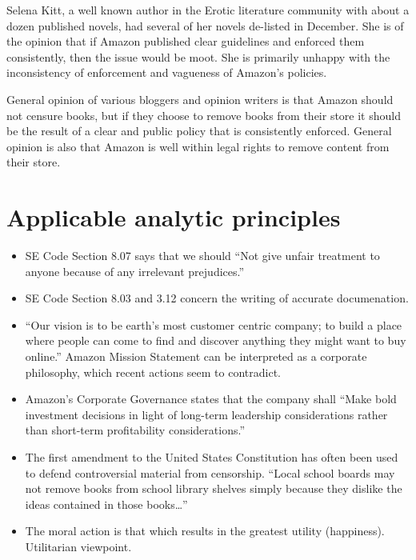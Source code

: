 \documentclass[12pt]{article}
\begin{document}
Selena Kitt, a well known author in the Erotic literature community with about a dozen published novels, had several of her novels de-listed in December.  She is of the opinion that if Amazon published clear guidelines and enforced them consistently, then the issue would be moot.  She is primarily unhappy with the inconsistency of enforcement and vagueness of Amazon's policies. \cite{KittSelfPubRevolution}

General opinion of various bloggers and opinion writers is that Amazon should not censure books, but if they choose to remove books from their store it should be the result of a clear and public policy that is consistently enforced. General opinion is also that Amazon is well within legal rights to remove content from their store.

\section{Applicable analytic principles}
\begin{itemize}
\item SE Code Section 8.07 says that we should ``Not give unfair treatment to anyone because of any irrelevant prejudices.'' \cite{secode}

\item SE Code Section 8.03 and 3.12 concern the writing of accurate documenation. \cite{secode}

\item ``Our vision is to be earth's most customer centric company; to build a place where people can come to find and discover anything they might want to buy online.'' Amazon Mission Statement can be interpreted as a corporate philosophy, which recent actions seem to contradict. \cite{AmazonIRFAQ}

\item Amazon's Corporate Governance states that the company shall ``Make bold investment decisions in light of long-term leadership considerations rather than short-term profitability considerations.'' \cite{AmazonCorpGovernance}

\item The first amendment to the United States Constitution has often been used to defend controversial material from censorship.  ``Local school boards may not remove books from school library shelves simply because they dislike the ideas contained in those books\ldots'' \cite{BOEvsPico}

\item The moral action is that which results in the greatest utility (happiness).  Utilitarian viewpoint.

\end{itemize}
\end{document}
